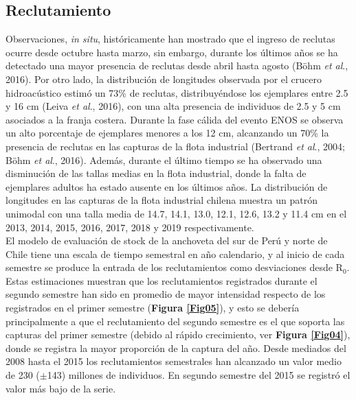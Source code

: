 \documentclass[letter,11pt]{article}
\begin{document}
\subsection{Reclutamiento}


Observaciones, \textit{in situ}, hist\'oricamente han mostrado que el ingreso de 
reclutas ocurre desde octubre hasta marzo, sin embargo, durante los \'ultimos a\~{n}os
se ha detectado una mayor presencia de reclutas desde abril hasta agosto (B\"ohm \textit{et al}., 2016). Por otro lado, la distribuci\'on de longitudes observada por el crucero hidroac\'ustico
estim\'o un 73\% de reclutas, distribuy\'endose los ejemplares entre 2.5 y 16 cm
(Leiva \textit{et al}., 2016), con una alta presencia de individuos de 2.5 y 5 cm asociados a la
franja costera. Durante la fase c\'alida del evento ENOS se observa un
alto porcentaje de ejemplares menores a los 12 cm, alcanzando un 70\% la
presencia de reclutas en las capturas de la flota industrial (Bertrand
\textit{et al}., 2004; B\"ohm \textit{et al}., 2016). Adem\'as, durante el
\'ultimo tiempo se ha observado una disminuci\'on de las tallas medias en la
flota industrial, donde la falta de ejemplares adultos ha estado ausente
en los \'ultimos a\~{n}os. La distribuci\'on de longitudes en las capturas de la
flota industrial chilena muestra un patr\'on unimodal con una talla media
de 14.7, 14.1, 13.0, 12.1, 12.6, 13.2 y 11.4 cm en el 2013, 2014,
2015, 2016, 2017, 2018 y 2019 respectivamente.\\


El modelo de evaluaci\'on de stock de la anchoveta del sur de Per\'u y norte de Chile
tiene una escala de tiempo semestral en a\~{n}o calendario, y al inicio de cada
semestre se produce la entrada de los reclutamientos como desviaciones desde R$_{0}$.
Estas estimaciones muestran que los reclutamientos registrados durante el segundo
semestre han sido en promedio de mayor intensidad respecto de los registrados en el
primer semestre (\textbf{Figura \ref{Fig05}}), y esto se deber\'ia principalmente a que
el reclutamiento del segundo semestre es el que soporta las capturas del primer
semestre (debido al r\'apido crecimiento, ver \textbf{Figura \ref{Fig04}}), donde se registra
la mayor proporci\'on de la captura del a\~{n}o. Desde mediados del 2008 hasta el 2015 los
reclutamientos semestrales han alcanzado un valor medio de 230 ($\pm$143) millones de
individuos. En segundo semestre del 2015 se registr\'o el valor m\'as bajo de la serie.\\
\end{document}
